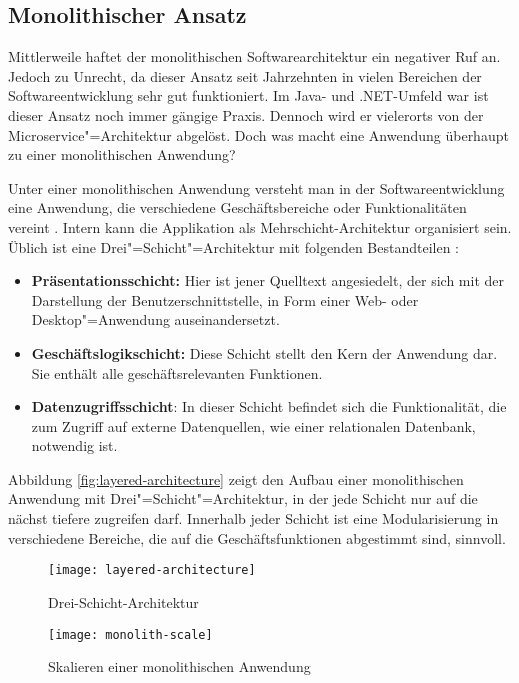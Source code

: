 \subsection{Monolithischer Ansatz}

Mittlerweile haftet der monolithischen Softwarearchitektur ein negativer Ruf an. Jedoch zu Unrecht, da dieser Ansatz seit Jahrzehnten  in vielen Bereichen der Softwareentwicklung sehr gut funktioniert. Im Java- und .NET-Umfeld war \bzw ist dieser Ansatz noch immer gängige Praxis. Dennoch wird er vielerorts von der Microservice"=Architektur abgelöst. Doch was macht eine Anwendung überhaupt zu einer monolithischen Anwendung?

Unter einer monolithischen Anwendung versteht man in der Softwareentwicklung eine Anwendung, die verschiedene Geschäftsbereiche oder Funktionalitäten vereint \cite{FowlerMS}. Intern kann die Applikation \zB als Mehrschicht-Architektur organisiert sein. Üblich ist eine Drei"=Schicht"=Architektur mit folgenden Bestandteilen \cite[19]{FowlerPEA}:

\begin{itemize}
	\item \textbf{Präsentationsschicht:} Hier ist jener Quelltext angesiedelt, der sich mit der Darstellung der Benutzerschnittstelle, \zB in Form einer Web- oder Desktop"=Anwendung auseinandersetzt.
	\item \textbf{Geschäftslogikschicht:} Diese Schicht stellt den Kern der Anwendung dar. Sie enthält alle geschäftsrelevanten Funktionen.
	\item \textbf{Datenzugriffsschicht}: In dieser Schicht befindet sich die Funktionalität, die zum Zugriff auf externe Datenquellen, wie \zB einer relationalen Datenbank, notwendig ist.
\end{itemize}

Abbildung \ref{fig:layered-architecture} zeigt den Aufbau einer monolithischen Anwendung mit Drei"=Schicht"=Architektur, in der jede Schicht nur auf die nächst tiefere zugreifen darf. Innerhalb jeder Schicht ist eine Modularisierung in verschiedene Bereiche, die auf die Geschäftsfunktionen abgestimmt sind, sinnvoll.

\begin{figure}[!htb]
\centering
{}
  \centering
	\texttt{[image: layered-architecture]}
	\caption{Drei-Schicht-Architektur}
	\label{fig:layered-architecture}
\endminipage
{}
  \centering
	\texttt{[image: monolith-scale]}
	\caption{Skalieren einer monolithischen Anwendung}
	\label{fig:monolith-scale}
\endminipage
\end{figure}

